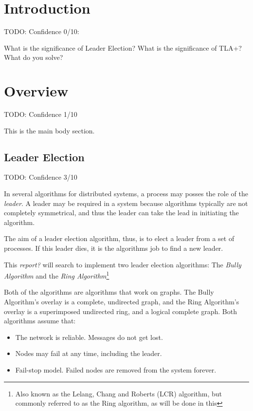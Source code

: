 \documentclass{report}
\begin{document}
\tableofcontents

\chapter{Introduction}
\begin{callout}
  TODO: Confidence 0/10:

  What is the significance of Leader Election? What is the significance of TLA+? What do you solve?
\end{callout}

\chapter{Overview}
\begin{callout}
TODO: Confidence 1/10
\end{callout}

This is the main body section.

\section{Leader Election}
\begin{callout}
TODO: Confidence 3/10
\end{callout}

In several algorithms for distributed systems, a process may posses the role of the \textit{leader}. A leader may be required in a system because algorithms typically are not completely symmetrical, and thus the leader can take the lead in initiating the algorithm. \cite{kshemkalyani2011distributed}

The aim of a leader election algorithm, thus, is to elect a leader from a set of processes. If this leader dies, it is the algorithms job to find a new leader.

This \textit{report?} will search to implement two leader election algorithms: The \textit{Bully Algorithm} and the \textit{Ring Algorithm}\footnote{Also known as the Lelang, Chang and Roberts (LCR) algorithm, but commonly referred to as the Ring algorithm, as will be done in this }

Both of the algorithms are algorithms that work on graphs. The Bully Algorithm's overlay is a complete, undirected graph, and the Ring Algorithm's overlay is a superimposed undirected ring, and a logical complete graph. Both algorithms assume that:
\begin{itemize}
  \item The network is reliable. Messages do not get lost.
  \item Nodes may fail at any time, including the leader.
  \item Fail-stop model. Failed nodes are removed from the system forever.
\end{itemize}
\end{document}
